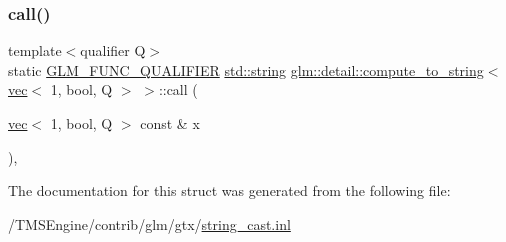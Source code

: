 \subsubsection{\texorpdfstring{call()}{call()}}
{\footnotesize\ttfamily template$<$qualifier Q$>$ \\
static \hyperlink{setup_8hpp_a33fdea6f91c5f834105f7415e2a64407}{G\+L\+M\+\_\+\+F\+U\+N\+C\+\_\+\+Q\+U\+A\+L\+I\+F\+I\+ER} \hyperlink{_s_d_l__opengl__glext_8h_ae84541b4f3d8e1ea24ec0f466a8c568b}{std\+::string} \hyperlink{structglm_1_1detail_1_1compute__to__string}{glm\+::detail\+::compute\+\_\+to\+\_\+string}$<$ \hyperlink{structglm_1_1vec}{vec}$<$ 1, bool, Q $>$ $>$\+::call (\begin{DoxyParamCaption}\item[{\hyperlink{structglm_1_1vec}{vec}$<$ 1, bool, Q $>$ const \&}]{x }\end{DoxyParamCaption})\hspace{0.3cm}{\ttfamily [inline]}, {\ttfamily [static]}}



The documentation for this struct was generated from the following file\+:\begin{DoxyCompactItemize}
\item 
/\+T\+M\+S\+Engine/contrib/glm/gtx/\hyperlink{string__cast_8inl}{string\+\_\+cast.\+inl}\end{DoxyCompactItemize}

